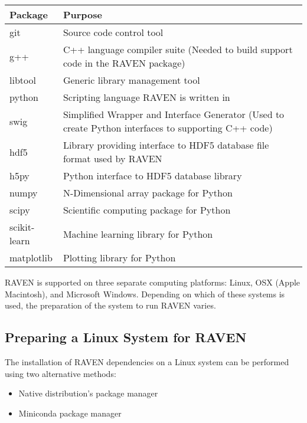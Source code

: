 \begin{center}
    \begin{tabular}{ | l | p{10cm} |}
    \hline Package & Purpose \\
    \hline git & Source code control tool \\
    \hline g++ & C++ language compiler suite (Needed to build
        support code in the RAVEN package) \\
    \hline libtool & Generic library management tool \\
    \hline python & Scripting language RAVEN is written in \\
    \hline swig & Simplified Wrapper and Interface Generator
        (Used to create Python interfaces to supporting C++ code) \\
    \hline hdf5 & Library providing interface to HDF5 database
        file format used by RAVEN \\
    \hline h5py & Python interface to HDF5 database library \\
    \hline numpy & N-Dimensional array package for Python \\
    \hline scipy &  Scientific computing package for Python \\
    \hline scikit-learn & Machine learning library for Python \\
    \hline matplotlib & Plotting library for Python \\
    \hline
    \end{tabular}
\end{center}


RAVEN is supported on three separate computing platforms:
Linux, OSX (Apple Macintosh), and Microsoft Windows.  Depending
on which of these systems is used, the preparation of the system
to run RAVEN varies.

\subsection{Preparing a Linux System for RAVEN}
\label{sysprep_linux}

The installation of RAVEN dependencies on a Linux system  can be performed
using two alternative methods: 

\begin{itemize}
    \item Native distribution's package manager
    \item Miniconda package manager
\end{itemize}

